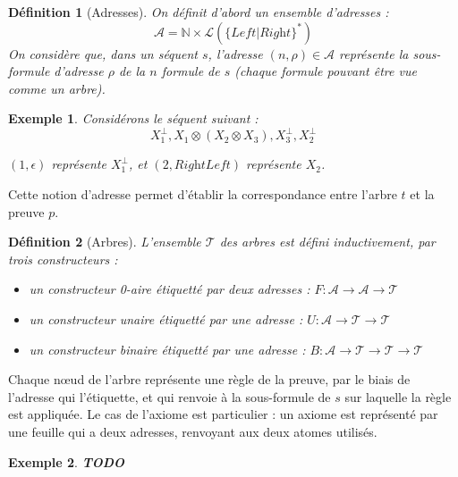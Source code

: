 \documentclass[11pt,a4paper]{article}
\newtheorem{example}{Exemple}
\newtheorem{definition}{Définition}
\newcommand*{\orth}{^\perp}
\newcommand*{\tensor}{\otimes}
\newcommand*{\Left}{\textit{Left}}
\newcommand*{\Right}{\textit{Right}}
\newcommand*{\trees}{\ensuremath{\mathcal{T}}}
\newcommand*{\todo}{{\normalfont \textbf{TODO}} }
\begin{document}
\begin{definition}[Adresses]
On définit d'abord un ensemble d'adresses :
\begin{equation*}
\mathcal{A} = \mathbb{N} \times \mathcal{L} ( \{ \Left | \Right\}^{*} )   
\end{equation*}
On considère que, dans un séquent $s$, l'adresse $(n, \rho) \in \mathcal{A}$ représente la sous-formule d'adresse $\rho$ de la $n$\ieme{} formule de $s$ (chaque formule pouvant être vue comme un arbre).
\end{definition}

\begin{example}
Considérons le séquent suivant : 
\begin{equation*}
X_1\orth, X_1 \tensor (X_2 \tensor X_3), X_3\orth, X_2\orth
\end{equation*}

$(1, \epsilon)$ représente $X_1\orth$, et $(2, \Right \Left)$ représente $X_2$. 
\end{example}

Cette notion d'adresse permet d'établir la correspondance entre l'arbre $t$ et la preuve $p$.

\begin{definition}[Arbres]
L'ensemble \trees{} des arbres est défini inductivement, par trois constructeurs :
\begin{itemize}
  \item un constructeur 0-aire étiquetté par deux adresses : $F: \mathcal{A} \rightarrow \mathcal{A} \rightarrow \trees$
  \item un constructeur unaire étiquetté par une adresse : $U: \mathcal{A} \rightarrow \trees \rightarrow \trees$
  \item un constructeur binaire étiquetté par une adresse : $B: \mathcal{A} \rightarrow \trees \rightarrow \trees \rightarrow \trees$
\end{itemize}
\end{definition}

Chaque n\oe ud de l'arbre représente une règle de la preuve, par le biais de l'adresse qui l'étiquette, et qui renvoie à la sous-formule de $s$ sur laquelle la règle est appliquée. Le cas de l'axiome est particulier : un axiome est représenté par une feuille qui a deux adresses, renvoyant aux deux atomes utilisés.

\begin{example}
  \todo
\end{example}
\end{document}
